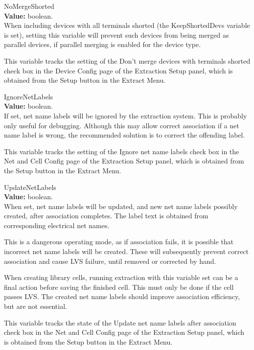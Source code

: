 \begin{description}
\item{\et NoMergeShorted}\\
{\bf Value:} boolean.\\
When including devices with all terminals shorted (the {\et
KeepShortedDevs} variable is set), setting this variable will prevent
such devices from being merged as parallel devices, if parallel
merging is enabled for the device type.

This variable tracks the setting of the {\cb Don't merge devices with
terminals shorted} check box in the {\cb Device Config} page of the
{\cb Extraction Setup} panel, which is obtained from the {\cb Setup}
button in the {\cb Extract Menu}.

\item{\et IgnoreNetLabels}\\
{\bf Value:} boolean.\\
If set, net name labels will be ignored by the extraction system. 
This is probably only useful for debugging.  Although this may allow
correct association if a net name label is wrong, the recommended
solution is to correct the offending label.

This variable tracks the setting of the {\cb Ignore net name labels}
check box in the {\cb Net and Cell Config} page of the {\cb Extraction
Setup} panel, which is obtained from the {\cb Setup} button in the
{\cb Extract Menu}.

\item{\et UpdateNetLabels}\\
{\bf Value:} boolean.\\
When set, net name labels will be updated, and new net name labels
possibly created, after association completes.  The label text is
obtained from corresponding electrical net names.

This is a dangerous operating mode, as if association fails, it is
possible that incorrect net name labels will be created.  These will
subsequently prevent correct association and cause LVS failure, until
removed or corrected by hand.

When creating library cells, running extraction with this variable set
can be a final action before saving the finished cell.  This must only
be done if the cell passes LVS.  The created net name labels should
improve association efficiency, but are not essential.

This variable tracks the state of the {\cb Update net name labels
after association} check box in the {\cb Net and Cell Config} page of
the {\cb Extraction Setup} panel, which is obtained from the {\cb
Setup} button in the {\cb Extract Menu}.


\end{description}
